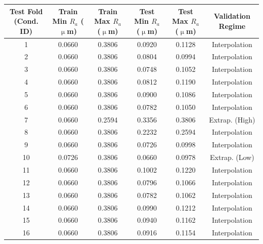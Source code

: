 \begin{tabular}{cccccc}
\toprule
Test Fold (Cond. ID) & Train Min $R_a$ (\(\upmu\)m) & Train Max $R_a$ (\(\upmu\)m) & Test Min $R_a$ (\(\upmu\)m) & Test Max $R_a$ (\(\upmu\)m) & Validation Regime \\
\midrule
1 & 0.0660 & 0.3806 & 0.0920 & 0.1128 & Interpolation \\
2 & 0.0660 & 0.3806 & 0.0804 & 0.0994 & Interpolation \\
3 & 0.0660 & 0.3806 & 0.0748 & 0.1052 & Interpolation \\
4 & 0.0660 & 0.3806 & 0.0812 & 0.1190 & Interpolation \\
5 & 0.0660 & 0.3806 & 0.0900 & 0.1086 & Interpolation \\
6 & 0.0660 & 0.3806 & 0.0782 & 0.1050 & Interpolation \\
7 & 0.0660 & 0.2594 & 0.3356 & 0.3806 & Extrap. (High) \\
8 & 0.0660 & 0.3806 & 0.2232 & 0.2594 & Interpolation \\
9 & 0.0660 & 0.3806 & 0.0726 & 0.0998 & Interpolation \\
10 & 0.0726 & 0.3806 & 0.0660 & 0.0978 & Extrap. (Low) \\
11 & 0.0660 & 0.3806 & 0.1002 & 0.1220 & Interpolation \\
12 & 0.0660 & 0.3806 & 0.0796 & 0.1066 & Interpolation \\
13 & 0.0660 & 0.3806 & 0.0782 & 0.1062 & Interpolation \\
14 & 0.0660 & 0.3806 & 0.0990 & 0.1212 & Interpolation \\
15 & 0.0660 & 0.3806 & 0.0940 & 0.1162 & Interpolation \\
16 & 0.0660 & 0.3806 & 0.0916 & 0.1154 & Interpolation \\
\bottomrule
\end{tabular}
